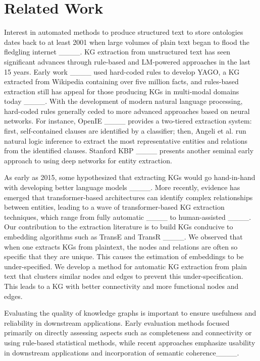 \section{Related Work}
Interest in automated methods to produce structured text to store ontologies dates back to at least 2001 when large volumes of plain text began to flood the fledgling internet ____. KG extraction from unstructured text has seen significant advances through rule-based and LM-powered approaches in the last 15 years.  Early work ____ used hard-coded rules to develop YAGO, a KG extracted from Wikipedia containing over five million facts, and rules-based extraction still has appeal for those producing KGs in multi-modal domains today ____.  With the development of modern natural language processing, hard-coded rules generally ceded to more advanced approaches based on neural networks.  For instance, OpenIE ____ provides a two-tiered extraction system: first, self-contained clauses are identified by a classifier; then, Angeli et al. run natural logic inference to extract the most representative entities and relations from the identified clauses.  Stanford KBP ____ presents another seminal early approach to using deep networks for entity extraction.  

As early as 2015, some hypothesized that extracting KGs would go hand-in-hand with developing better language models ____.  More recently, evidence has emerged that transformer-based architectures can identify complex relationships between entities, leading to a wave of transformer-based KG extraction techniques, which range from fully automatic ____ to human-assisted ____.  Our contribution to the extraction literature is to build KGs conducive to embedding algorithms such as TransE and TransR ____.  We observed that when one extracts KGs from plaintext, the nodes and relations are often so specific that they are unique.  This causes the estimation of embeddings to be under-specified.  We develop a method for automatic KG extraction from plain text that clusters similar nodes and edges to prevent this under-specification. This leads to a KG with better connectivity and more functional nodes and edges. 

Evaluating the quality of knowledge graphs is important to ensure usefulness and reliability in downstream applications. Early evaluation methods focused primarily on directly assessing aspects such as completeness and connectivity or using rule-based statistical methods, while recent approaches emphasize usability in downstream applications and incorporation of semantic coherence____. 

